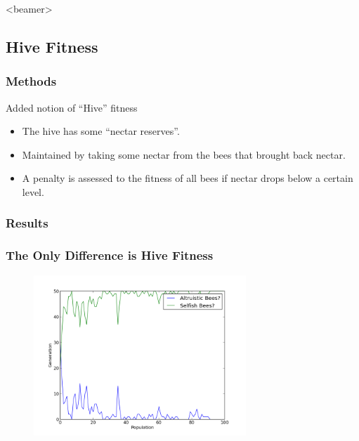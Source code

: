 \documentclass{beamer}
\begin{document}
    \setcounter{tocdepth}{2}
      \begin{frame}<beamer>
      \end{frame}
    \setcounter{tocdepth}{3}

    \subsection{Hive Fitness} %
    \label{sub:hive_fitness}
      \subsubsection{Methods} %
      \label{ssub:methods}
        \begin{frame}{Added notion of ``Hive'' fitness}
          \begin{itemize}
            \item The hive has some ``nectar reserves''.
            \item Maintained by taking some nectar from the bees that brought 
                  back nectar.
            \item A penalty is assessed to the fitness of all bees if nectar 
                  drops below a certain level.
          \end{itemize}
        \end{frame}

      \subsubsection{Results} %
      \label{ssub:results}

        \begin{frame}[t]\frametitle{The Only Difference is Hive Fitness}
          \begin{figure}
          \includegraphics[width=8cm]{results/hive_influenced_bees.png}
          \end{figure}
        \end{frame}
\end{document}

